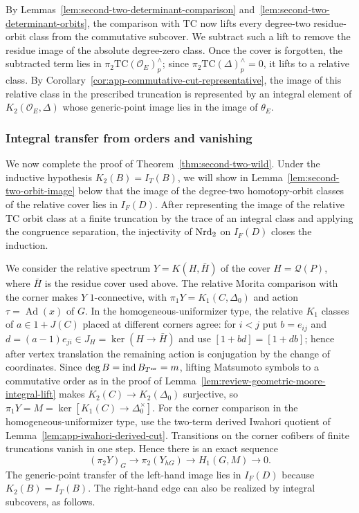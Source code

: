 By Lemmas~\ref{lem:second-two-determinant-comparison} and~\ref{lem:second-two-determinant-orbits}, the comparison with $\mathrm{TC}$ now lifts every degree-two residue-orbit class from the commutative subcover.
We subtract such a lift to remove the residue image of the absolute degree-zero class.
Once the cover is forgotten, the subtracted term lies in $\pi_2\mathrm{TC}(\mathcal O_E)^\wedge_p$; since $\pi_2\mathrm{TC}(\Delta)^\wedge_p=0$, it lifts to a relative class.
By Corollary~\ref{cor:app-commutative-cut-representative}, the image of this relative class in the prescribed truncation is represented by an integral element of $K_2(\mathcal O_E,\Delta)$ whose generic-point image lies in the image of $\theta_E$.

\subsubsection{Integral transfer from orders and vanishing}
We now complete the proof of Theorem~\ref{thm:second-two-wild}.
Under the inductive hypothesis $K_2(B)=I_T(B)$, we will show in Lemma~\ref{lem:second-two-orbit-image} below that the image of the degree-two homotopy-orbit classes of the relative cover lies in $I_F(D)$.
After representing the image of the relative $\mathrm{TC}$ orbit class at a finite truncation by the trace of an integral class and applying the congruence separation, the injectivity of $\operatorname{Nrd}_2$ on $I_F(D)$ closes the induction.

We consider the relative spectrum $Y=K(H,\bar H)$ of the cover $H=\mathcal Q(P)$, where $\bar H$ is the residue cover used above.
The relative Morita comparison with the corner makes $Y$ $1$-connective, with $\pi_1Y=K_1(C,\Delta_0)$ and action $\tau=\operatorname{Ad}(x)$ of $G$.
In the homogeneous-uniformizer type, the relative $K_1$ classes of $a\in1+J(C)$ placed at different corners agree: for $i<j$ put $b=e_{ij}$ and $d=(a-1)e_{ji}\in J_H=\ker(H\to\bar H)$ and use $[1+bd]=[1+db]$; hence after vertex translation the remaining action is conjugation by the change of coordinates.
Since $\deg B=\operatorname{ind} B_{T^{\mathrm{nr}}}=m$, lifting Matsumoto symbols to a commutative order as in the proof of Lemma~\ref{lem:review-geometric-moore-integral-lift} makes $K_2(C)\to K_2(\Delta_0)$ surjective, so $\pi_1Y=M=\ker[K_1(C)\to\Delta_0^\times]$.
For the corner comparison in the homogeneous-uniformizer type, use the two-term derived Iwahori quotient of Lemma~\ref{lem:app-iwahori-derived-cut}.
Transitions on the corner cofibers of finite truncations vanish in one step.
Hence there is an exact sequence
\[
 (\pi_2Y)_G\longrightarrow \pi_2(Y_{hG})
    \longrightarrow H_1(G,M)\longrightarrow 0.
\]
The generic-point transfer of the left-hand image lies in $I_F(D)$ because $K_2(B)=I_T(B)$.
The right-hand edge can also be realized by integral subcovers, as follows.

